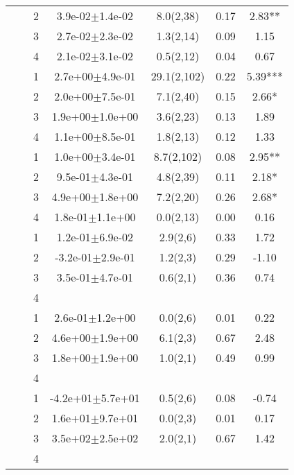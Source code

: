 \begin{longtable}{llccccS[table-format=-2.2, table-space-text-post = {***}]}
   &  & 2 &  3.9e-02$\pm$1.4e-02 & 8.0(2,38) & 0.17 & 2.83** \\ 
   &  & 3 &  2.7e-02$\pm$2.3e-02 & 1.3(2,14) & 0.09 & 1.15 \\ 
   &  & 4 &  2.1e-02$\pm$3.1e-02 & 0.5(2,12) & 0.04 & 0.67 \\ 
   \midrule
{} & {} & 1 &  2.7e+00$\pm$4.9e-01 & 29.1(2,102) & 0.22 & 5.39*** \\ 
   &  & 2 &  2.0e+00$\pm$7.5e-01 & 7.1(2,40) & 0.15 & 2.66* \\ 
   &  & 3 &  1.9e+00$\pm$1.0e+00 & 3.6(2,23) & 0.13 & 1.89 \\ 
   &  & 4 &  1.1e+00$\pm$8.5e-01 & 1.8(2,13) & 0.12 & 1.33 \\ 
   \midrule
{} & {} & 1 &  1.0e+00$\pm$3.4e-01 & 8.7(2,102) & 0.08 & 2.95** \\ 
   &  & 2 &  9.5e-01$\pm$4.3e-01 & 4.8(2,39) & 0.11 & 2.18* \\ 
   &  & 3 &  4.9e+00$\pm$1.8e+00 & 7.2(2,20) & 0.26 & 2.68* \\ 
   &  & 4 &  1.8e-01$\pm$1.1e+00 & 0.0(2,13) & 0.00 & 0.16 \\ 
   \midrule
{} & {} & 1 &  1.2e-01$\pm$6.9e-02 & 2.9(2,6) & 0.33 & 1.72 \\ 
   &  & 2 & -3.2e-01$\pm$2.9e-01 & 1.2(2,3) & 0.29 & -1.10 \\ 
   &  & 3 &  3.5e-01$\pm$4.7e-01 & 0.6(2,1) & 0.36 & 0.74 \\ 
   &  & 4 &  &  &  &  \\ 
   \midrule
{} & {} & 1 &  2.6e-01$\pm$1.2e+00 & 0.0(2,6) & 0.01 & 0.22 \\ 
   &  & 2 &  4.6e+00$\pm$1.9e+00 & 6.1(2,3) & 0.67 & 2.48 \\ 
   &  & 3 &  1.8e+00$\pm$1.9e+00 & 1.0(2,1) & 0.49 & 0.99 \\ 
   &  & 4 &  &  &  &  \\ 
   \midrule
{} & {} & 1 & -4.2e+01$\pm$5.7e+01 & 0.5(2,6) & 0.08 & -0.74 \\ 
   &  & 2 &  1.6e+01$\pm$9.7e+01 & 0.0(2,3) & 0.01 & 0.17 \\ 
   &  & 3 &  3.5e+02$\pm$2.5e+02 & 2.0(2,1) & 0.67 & 1.42 \\ 
   &  & 4 &  &  &  &  \\ 

\end{longtable}
